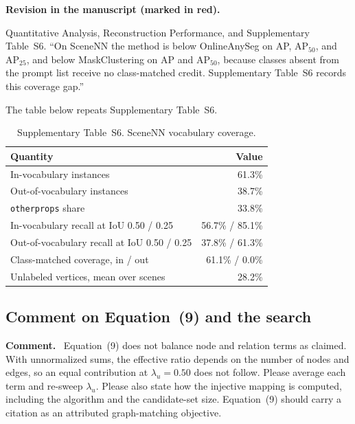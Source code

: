 \documentclass[11pt]{article}
\newcommand{\revcomment}[1]{%
  \par\vspace{0.6em}\noindent\textcolor{revblue}{\textbf{Comment.}}\ %
  \textcolor{revblue}{#1}\par\vspace{0.4em}}
\newcommand{\revchange}[1]{%
  \par\noindent\textbf{Revision in the manuscript (marked in red).}\par
  \noindent\textcolor{revred}{#1}\par\vspace{0.8em}}
\begin{document}
\revchange{Quantitative Analysis, Reconstruction Performance, and Supplementary Table~S6. ``On SceneNN the method is below OnlineAnySeg on AP, AP\(_{50}\), and AP\(_{25}\), and below MaskClustering on AP and AP\(_{50}\), because classes absent from the prompt list receive no class-matched credit. Supplementary Table~S6 records this coverage gap.''}

\noindent The table below repeats Supplementary Table~S6.

\begin{table}[ht]
\centering
\caption{Supplementary Table~S6. SceneNN vocabulary coverage.}
\label{tab:scenenn}
\small
\begin{tabular}{lr}
\toprule
Quantity & Value \\
\midrule
In-vocabulary instances & 61.3\% \\
Out-of-vocabulary instances & 38.7\% \\
\texttt{otherprops} share & 33.8\% \\
In-vocabulary recall at IoU 0.50 / 0.25 & 56.7\% / 85.1\% \\
Out-of-vocabulary recall at IoU 0.50 / 0.25 & 37.8\% / 61.3\% \\
Class-matched coverage, in / out & 61.1\% / 0.0\% \\
Unlabeled vertices, mean over scenes & 28.2\% \\
\bottomrule
\end{tabular}
\end{table}

\subsection*{Comment on Equation~(9) and the search}

\revcomment{Equation~(9) does not balance node and relation terms as claimed. With unnormalized sums, the effective ratio depends on the number of nodes and edges, so an equal contribution at \(\lambda_u=0.50\) does not follow. Please average each term and re-sweep \(\lambda_u\). Please also state how the injective mapping is computed, including the algorithm and the candidate-set size. Equation~(9) should carry a citation as an attributed graph-matching objective.}
\end{document}
